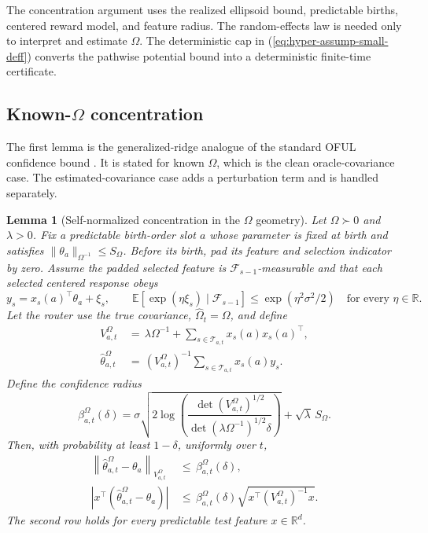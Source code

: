 \documentclass{article} %
\newtheorem{lemma}[theorem]{Lemma}
\renewcommand{\eqref}[1]{\textup{(\ref{#1})}}
\begin{document}
The concentration argument uses the realized ellipsoid bound, predictable
births, centered reward model, and feature radius. The random-effects law is
needed only to interpret and estimate $\Omega$. The deterministic cap in
\eqref{eq:hyper-assump-small-deff} converts the pathwise potential bound into
a deterministic finite-time certificate.

\subsection{Known-\(\Omega\) concentration}

The first lemma is the generalized-ridge analogue of the standard OFUL confidence bound \citep{abbasi2011oful,chu2011linucb}.  It is stated for known \(\Omega\), which is the clean oracle-covariance case.  The estimated-covariance case adds a perturbation term and is handled separately.

\begin{lemma}[Self-normalized concentration in the \(\Omega\) geometry]
\label{lem:hyper-sn}
Let \(\Omega\succ0\) and \(\lambda>0\). Fix a predictable birth-order slot
\(a\) whose parameter is fixed at birth and satisfies
\(\|\theta_a\|_{\Omega^{-1}}\le S_\Omega\). Before its birth, pad its feature
and selection indicator by zero. Assume the padded selected feature is
\(\mathcal F_{s-1}\)-measurable and that each selected centered response obeys
\begin{equation}
y_s=x_s(a)^\top\theta_a+\xi_s,
\qquad
\mathbb E[\exp(\eta\xi_s)\mid\mathcal F_{s-1}]
\le \exp(\eta^2\sigma^2/2)
\quad\text{for every }\eta\in\mathbb R.
\end{equation}
Let the router use the true covariance, \(\widehat\Omega_t=\Omega\), and define
\begin{align}
V_{a,t}^{\Omega}
&\,=\,
\lambda\Omega^{-1}
+
\sum_{s\in\mathcal{T}_{a,t}}
x_s(a)x_s(a)^\top,
\label{eq:hyper-known-V}
\\
\widehat{\theta}_{a,t}^{\Omega}
&\,=\,
\left(V_{a,t}^{\Omega}\right)^{-1}
\sum_{s\in\mathcal{T}_{a,t}}
x_s(a)y_s.
\label{eq:hyper-known-est}
\end{align}
Define the confidence radius
\begin{equation}
\label{eq:hyper-beta}
\beta_{a,t}^{\Omega}(\delta)
=
\sigma
\sqrt{
2\log
\left(
\frac{
\det(V_{a,t}^{\Omega})^{1/2}
}{
\det(\lambda\Omega^{-1})^{1/2}\delta
}
\right)
}
+
\sqrt{\lambda}\,S_{\Omega}.
\end{equation}
Then, with probability at least \(1-\delta\), uniformly over \(t\),
\begin{align}
\left\|
\widehat{\theta}_{a,t}^{\Omega}-\theta_a
\right\|_{V_{a,t}^{\Omega}}
&\,\leq\,
\beta_{a,t}^{\Omega}(\delta),
\label{eq:hyper-sn-param}
\\
\left|
x^\top
\left(
\widehat{\theta}_{a,t}^{\Omega}-\theta_a
\right)
\right|
&\,\leq\,
\beta_{a,t}^{\Omega}(\delta)
\sqrt{x^\top\left(V_{a,t}^{\Omega}\right)^{-1}x}.
\label{eq:hyper-sn-prediction}
\end{align}
The second row holds for every predictable test feature \(x\in\mathbb R^d\).
\end{lemma}
\end{document}
